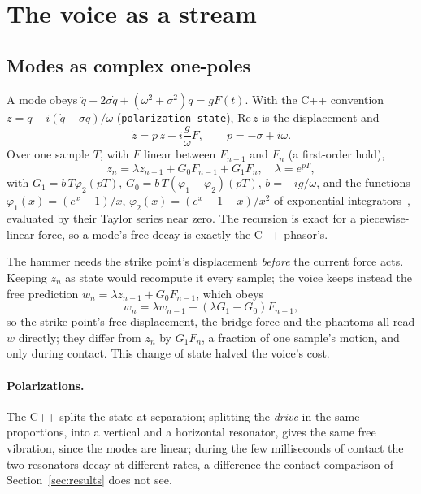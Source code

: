 \documentclass[10pt,a4paper,twocolumn]{article}
\newcommand{\code}[1]{\texttt{#1}}
\begin{document}
\section{The voice as a stream}
\label{sec:voice}

\subsection{Modes as complex one-poles}

A mode obeys $\ddot q + 2\sigma\dot q + (\omega^2+\sigma^2) q = g F(t)$. With the C++ convention $z = q - i(\dot q + \sigma q)/\omega$ (\code{polarization\_state}), $\mathrm{Re}\,z$ is the displacement and
\begin{equation}
\dot z = p\,z - i\frac{g}{\omega}F, \qquad p = -\sigma + i\omega.
\end{equation}
Over one sample $T$, with $F$ linear between $F_{n-1}$ and $F_n$ (a first-order hold),
\begin{equation}
z_n = \lambda z_{n-1} + G_0 F_{n-1} + G_1 F_n, \quad \lambda = e^{pT},
\end{equation}
with $G_1 = b\,T\varphi_2(pT)$, $G_0 = b\,T(\varphi_1 - \varphi_2)(pT)$, $b = -ig/\omega$, and the functions $\varphi_1(x) = (e^x - 1)/x$, $\varphi_2(x) = (e^x-1-x)/x^2$ of exponential integrators~\cite{hochbruck2010}, evaluated by their Taylor series near zero. The recursion is exact for a piecewise-linear force, so a mode's free decay is exactly the C++ phasor's.

The hammer needs the strike point's displacement \emph{before} the current force acts. Keeping $z_n$ as state would recompute it every sample; the voice keeps instead the free prediction $w_n = \lambda z_{n-1} + G_0 F_{n-1}$, which obeys
\begin{equation}
w_n = \lambda w_{n-1} + (\lambda G_1 + G_0) F_{n-1},
\end{equation}
so the strike point's free displacement, the bridge force and the phantoms all read $w$ directly; they differ from $z_n$ by $G_1F_n$, a fraction of one sample's motion, and only during contact. This change of state halved the voice's cost.

\paragraph{Polarizations.} The C++ splits the state at separation; splitting the \emph{drive} in the same proportions, into a vertical and a horizontal resonator, gives the same free vibration, since the modes are linear; during the few milliseconds of contact the two resonators decay at different rates, a difference the contact comparison of Section~\ref{sec:results} does not see.
\end{document}
